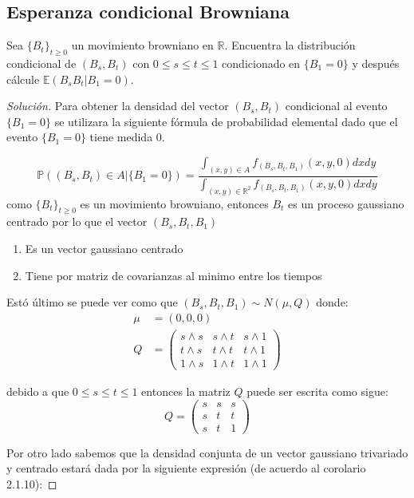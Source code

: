 \documentclass[11pt,notitlepage]{article}
\newenvironment{solucion}
  {\begin{proof}[Solución]}
  {\end{proof}}
\begin{document}
\subsection{Esperanza condicional Browniana} Sea \(\{B_t\}_{t\geq 0}\) un  movimiento browniano en \(\mathbb{R}\). Encuentra la distribución condicional de \((B_s,B_t)\) con 
\(0\leq s \leq t \leq 1\) condicionado en \(\{B_1 = 0\}\) y después cálcule \(\mathbb{E}(B_sB_t|B_1 = 0)\).
\begin{solucion}
Para obtener la densidad del vector \((B_s,B_t)\) condicional al evento \(\{B_1 = 0\}\) se utilizara la siguiente fórmula de probabilidad elemental dado que el evento
\(\{B_1 = 0\}\) tiene medida 0.

\begin{equation}\label{3.1}
    \mathbb{P}((B_s,B_t) \in A | \{B_1 = 0\}) =\frac{\int_{(x,y)\in A}
                       f_{(B_s,B_t,B_1)}(x,y,0)dxdy}{\int_{(x,y)\in\mathbb{R}^2}
                       f_{(B_s,B_t,B_1)}(x,y,0)dxdy}
\end{equation}
como \(\{B_t\}_{t\geq 0}\) es un movimiento browniano, entonces \(B_t\) es un proceso gaussiano centrado por lo que el vector \((B_s,B_t,B_1)\)
\begin{enumerate}
    \item Es un vector gaussiano centrado
    \item Tiene por matriz de covarianzas al minimo entre los tiempos 
\end{enumerate}
Estó último se puede ver como que \((B_s,B_t,B_1)\sim N(\mu,Q)\) donde: 
\begin{align*}
    \mu &= (0,0,0)\\
     Q  &= \begin{pmatrix}
s\wedge s & s\wedge t & s\wedge 1\\ 
t\wedge s & t\wedge t & t\wedge 1\\ 
1\wedge s & 1\wedge t & 1\wedge 1
\end{pmatrix}
\end{align*}

debido a que \(0\leq s \leq t \leq 1\) entonces la matriz \(Q\) puede ser escrita como sigue: 
\[
Q  = \begin{pmatrix}
s & s & s\\ 
s & t & t\\ 
s & t & 1
\end{pmatrix}
\]

Por otro lado sabemos que la densidad conjunta de un vector gaussiano trivariado y centrado estará dada por la siguiente
expresión (de acuerdo al corolario 2.1.10): 


\end{solucion}
\end{document}
